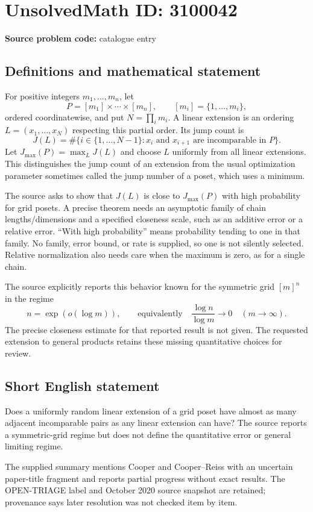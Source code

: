 \documentclass[11pt]{article}
\begin{document}
\section*{UnsolvedMath ID: 3100042}
\textbf{Source problem code:} catalogue entry
\subsection{Definitions and mathematical statement}
For positive integers $m_1,\ldots,m_n$, let
\[
 P=[m_1]\times\cdots\times[m_n],\qquad
 [m_i]=\{1,\ldots,m_i\},
\]
ordered coordinatewise, and put $N=\prod_i m_i$. A linear extension is an ordering $L=(x_1,\ldots,x_N)$ respecting this partial order. Its jump count is
\[
 J(L)=\#\{i\in\{1,\ldots,N-1\}:x_i
                         \text{ and }x_{i+1}\text{ are incomparable in }P\}.
\]
Let $J_{\max}(P)=\max_LJ(L)$ and choose $L$ uniformly from all linear extensions. This distinguishes the jump count of an extension from the usual optimization parameter sometimes called the jump number of a poset, which uses a minimum.

The source asks to show that $J(L)$ is close to $J_{\max}(P)$ with high probability for grid posets. A precise theorem needs an asymptotic family of chain lengths/dimensions and a specified closeness scale, such as an additive error or a relative error. ``With high probability'' means probability tending to one in that family. No family, error bound, or rate is supplied, so one is not silently selected. Relative normalization also needs care when the maximum is zero, as for a single chain.

The source explicitly reports this behavior known for the symmetric grid $[m]^n$ in the regime
\[
 n=\exp(o(\log m)),\qquad\text{equivalently}\quad
 \frac{\log n}{\log m}\to0
 \quad(m\to\infty).
\]
The precise closeness estimate for that reported result is not given. The requested extension to general products retains these missing quantitative choices for review.
\subsection{Short English statement}
Does a uniformly random linear extension of a grid poset have almost as many adjacent incomparable pairs as any linear extension can have? The source reports a symmetric-grid regime but does not define the quantitative error or general limiting regime.

The supplied summary mentions Cooper and Cooper--Reiss with an uncertain paper-title fragment and reports partial progress without exact results. The OPEN-TRIAGE label and October 2020 source snapshot are retained; provenance says later resolution was not checked item by item.
\end{document}
